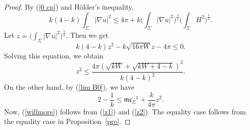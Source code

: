 \documentclass[10pt,a4paper]{amsart}
\begin{document}
\begin{proof}
	By (\ref{0 cp}) and H\"older's inequality, 
	$$
	k(4-k)\int_{\Sigma}|\nabla u|^{2}\leq 4\pi+k\Big(\int_{\Sigma}|\nabla u|^{2}\Big)^{\frac{1}{2}}\Big(\int_{\Sigma}H^{2}\Big)^{\frac{1}{2}}.
	$$
	Let $ z=\Big(\int_{\Sigma}|\nabla u|^{2}\Big)^{\frac{1}{2}} $. Then we get
	$$
	k(4-k)z^{2}-k\sqrt{16\pi W}z-4\pi\leq 0.
	$$
	Solving this equation, we obtain
\begin{equation}\label{z1}
	z^{2}\leq \frac{4\pi(\sqrt{kW}+\sqrt{kW+4-k})^{2}}{k(4-k)^{2}}.
\end{equation}
	On the other hand, by (\ref{lim B0}), we have 
\begin{equation}\label{z2}
	2-\frac{1}{k}\leq \mathfrak{m}\mathfrak{c}_{\Sigma}^{-1}+\frac{k}{4\pi}z^{2}.
\end{equation}
Now, (\ref{willmore}) follows from (\ref{z1}) and (\ref{z2}). The equality case follows from the equality case in Proposition~\ref{pro}.
\end{proof}
\end{document}
